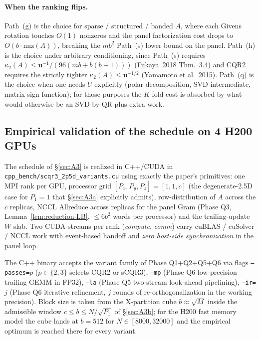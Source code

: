 \documentclass[11pt]{article}
\begin{document}
\paragraph{When the ranking flips.}
Path~(g) is the choice for sparse / structured / banded $A$, where
each Givens rotation touches $O(1)$ nonzeros and the panel
factorization cost drops to $O(b \cdot \text{nnz}(A))$, breaking the
$m b^2$ Path~(s) lower bound on the panel.  Path~(h) is the choice
under arbitrary conditioning, since Path~(s) requires
$\kappa_2(A) \le \mathbf{u}^{-1}/(96(mb + b(b{+}1)))$
(Fukaya~2018 Thm.~3.4) and CQR2 requires the strictly tighter
$\kappa_2(A) \le \mathbf{u}^{-1/2}$ (Yamamoto et al.\ 2015).  Path~(q)
is the choice when one needs $U$ explicitly (polar decomposition, SVD
intermediate, matrix sign function); for those purposes the
$K$-fold cost is absorbed by what would otherwise be an SVD-by-QR
plus extra work.

\subsection*{Empirical validation of the schedule on 4 H200 GPUs}
\label{sec:empirical}

The schedule of \S\ref{sec:A3} is realized in C++/CUDA in
\texttt{cpp\_bench/scqr3\_2p5d\_variants.cu} using exactly the paper's
primitives: one MPI rank per GPU, processor grid $[P_x, P_y, P_z] =
[1, 1, c]$ (the degenerate-2.5D case for $P_1 = 1$ that
\S\ref{sec:A3a} explicitly admits), row-distribution of $A$ across the
$c$ replicas, NCCL Allreduce across replicas for the panel Gram (Phase
Q3, Lemma~\ref{lem:reduction-LB}, $\le 6 b^2$ words per processor) and
the trailing-update $W$ slab. Two CUDA streams per rank
(\emph{compute}, \emph{comm}) carry cuBLAS / cuSolver / NCCL work with
event-based handoff and \emph{zero host-side synchronization} in the
panel loop.

The C++ binary accepts the variant family of Phase Q1+Q2+Q5+Q6 via flags
\texttt{--passes=}$p$ ($p \in \{2,3\}$ selects CQR2 or sCQR3),
\texttt{--mp} (Phase Q6 low-precision trailing GEMM in FP32),
\texttt{--la} (Phase Q5 two-stream look-ahead pipelining),
\texttt{--ir=}$j$ (Phase Q6 iterative refinement, $j$ rounds of
re-orthogonalization in the working precision). Block size is taken
from the X-partition cube $b \approx \sqrt{M}$ inside the admissible
window $c \le b \le N/\sqrt{P_1}$ of \S\ref{sec:A3b}; for the H200 fast
memory model the cube lands at $b = 512$ for $N \in [8000, 32000]$ and
the empirical optimum is reached there for every variant.
\end{document}
